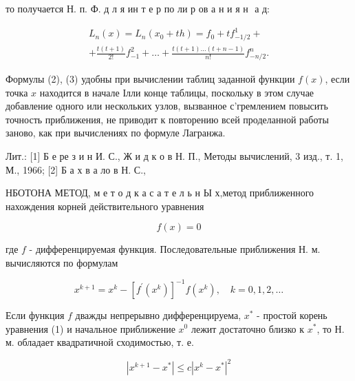\documentclass[10pt]{article}
\begin{document}
то получается Н. п. Ф. д л я ин т е р по ли р ов а н и я н $\mathbf{\text { а д: }}$



\[

\begin{gathered}

L_{n}(x)=L_{n}\left(x_{0}+t h\right)=f_{0}+t f_{-1 / 2}^{1}+ \\

+\frac{t(t+1)}{2 !} f_{-1}^{2}+\ldots+\frac{t(t+1) \ldots(t+n-1)}{n !} f_{-n / 2}^{n} .

\end{gathered}

\]



Формулы (2), (3) удобны при вычислении таблиц заданной функции $f(x)$, если точка $x$ находится в начале Ілли конце таблицы, поскольку в этом случае добавление одного или нескольких узлов, вызванное с'гремлением повысить точность приближения, не приводит к повторению всей проделанной работы заново, как при вычислениях по формуле Лагранжа.



Лит.: [1] Б е ре з и н И. С., Ж и д к о в Н. П., Методы вычислений, 3 изд., т. 1, М., 1966; [2] Б а х в а ло в Н. С.,



НБОТОНА МЕТОД, м е т о д к а с а т е л ь н Ы х,метод приближенного нахождения корней действительного уравнения



\[

f(x)=0

\]



где $f$ - дифференцируемая функция. Последовательные приближения Н. м. вычисляются по формулам



\[

x^{k+1}=x^{k}-\left[f^{\prime}\left(x^{k}\right)\right]^{-1} f\left(x^{k}\right), \quad k=0,1,2, \ldots

\]



Если функция $f$ дважды непрерывно дифференцируема, $x^{*}$ - простой корень уравнения (1) и начальное приближение $x^{0}$ лежит достаточно близко к $x^{*}$, то Н. м. обладает квадратичной сходимостью, т. е.



\[

\left|x^{k+1}-x^{*}\right| \leqslant c\left|x^{k}-x^{*}\right|^{2}

\]
\end{document}
